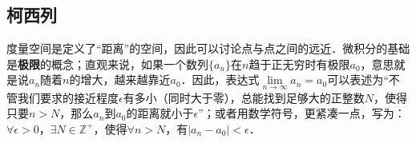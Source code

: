 

\subsection{柯西列}

度量空间是定义了“距离”的空间，因此可以讨论点与点之间的远近．微积分的基础是\textbf{极限}的概念；直观来说，如果一个数列$\{a_n\}$在$n$趋于正无穷时有极限$a_0$，意思就是说$a_n$随着$n$的增大，越来越靠近$a_0$．因此，表达式$\lim\limits_{n\rightarrow\infty}a_n=a_0$可以表述为“不管我们要求的接近程度$\epsilon$有多小（同时大于零），总能找到足够大的正整数$N$，使得只要$n>N$，那么$a_n$到$a_0$的距离就小于$\epsilon$”；或者用数学符号，更紧凑一点，写为：$\forall\epsilon>0$，$\exists N\in\mathbb{Z}^+$，使得$\forall n>N$，有$|a_n-a_0|<\epsilon$．